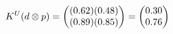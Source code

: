 \documentclass[preview]{standalone}
\begin{document}
\begin{align*}
\special{dvisvgm:raw <g id='unique000'>}K^U(d \otimes p) = \begin{pmatrix} (0.62)(0.48) \\ (0.89)(0.85) \end{pmatrix} = \begin{pmatrix} 0.30 \\ 0.76 \end{pmatrix}\special{dvisvgm:raw </g>}
\end{align*}
\end{document}
